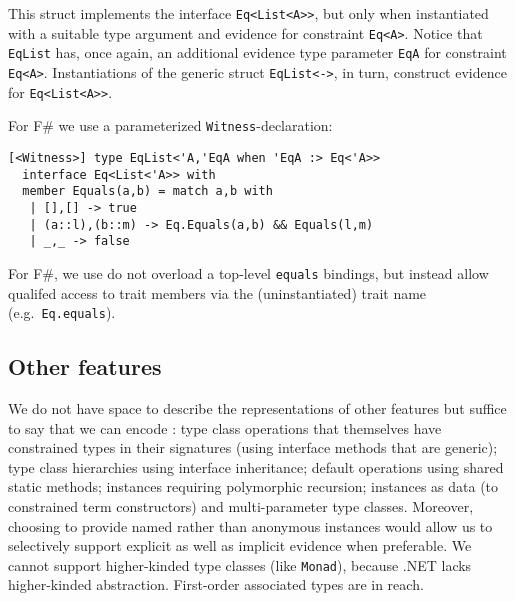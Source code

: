 \documentclass[preprint]{sig-alternate-05-2015}
\newif\ifclassic
\begin{document}
This struct implements the interface \lstinline{Eq<List<A>>}, but only when instantiated with a suitable type argument and evidence for constraint \lstinline{Eq<A>}.
Notice that \lstinline{EqList} has, once again, an additional evidence type parameter  \lstinline{EqA} for constraint \lstinline{Eq<A>}.
Instantiations of the generic struct \lstinline{EqList<->}, in turn, construct evidence for \lstinline{Eq<List<A>>}.

\ifclassic
For F\# we adopt the more concise, nameless declaration:

\lstset{language={FSharp}}
\begin{lstlisting}
instance Eq 'a => Eq (List 'a) where 
  Equals(a,b) = match a,b with
    | [],[] -> true
    | (a::l),(b::m) -> Equals(a,b) && Equals(l,m)
    | _,_ -> false
\end{lstlisting}
\else
For F\# we use a parameterized \lstinline{Witness}-declaration:

\begin{lstlisting}
[<Witness>] type EqList<'A,'EqA when 'EqA :> Eq<'A>>
  interface Eq<List<'A>> with
  member Equals(a,b) = match a,b with
   | [],[] -> true
   | (a::l),(b::m) -> Eq.Equals(a,b) && Equals(l,m)
   | _,_ -> false
\end{lstlisting}
For F\#, we use do not overload a top-level \lstinline{equals} bindings, but 
instead allow qualifed access to trait members via the (uninstantiated) trait name (e.g.\ \lstinline{Eq.equals}).

\fi
\subsection{Other features}

We do not have space to describe the representations of other features but suffice to say that we can encode \cite{natural}:
type class operations that themselves have constrained types in their signatures (using interface methods that are generic);
type class hierarchies  using interface inheritance; default operations using shared static methods; instances requiring 
polymorphic recursion; instances as data (to constrained term constructors) and multi-parameter type classes. Moreover, choosing to provide named rather than anonymous instances would allow us to selectively support
explicit as well as implicit evidence when preferable. 
We cannot support  higher-kinded type classes (like \lstinline{Monad}), because .NET lacks higher-kinded abstraction.
First-order associated types are in reach.
\end{document}
